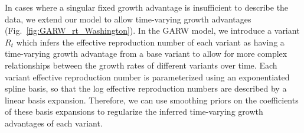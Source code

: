 \documentclass[11pt,oneside,letterpaper]{article}
\def\tbc#1{\textcolor{purple}{[#1]}}
\begin{document}
In cases where a singular fixed growth advantage is insufficient to describe the data, we extend our model to allow time-varying growth advantages (Fig.~\ref{fig:GARW_rt_Washington}).
In the GARW model, we introduce a variant $R_{t}$ which infers the effective reproduction number of each variant as having a time-varying growth advantage from a base variant to allow for more complex relationships between the growth rates of different variants over time.
Each variant effective reproduction number is parameterized using an exponentiated spline basis, so that the log effective reproduction numbers are described by a linear basis expansion.
Therefore, we can use smoothing priors on the coefficients of these basis expansions to regularize the inferred time-varying growth advantages of each variant.
\end{document}
